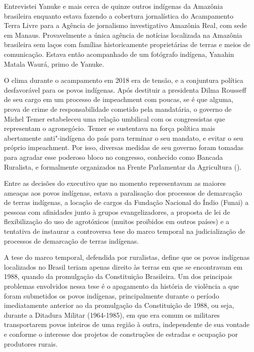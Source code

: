 \asterisc

Entrevistei Yanuke e mais cerca de quinze outros indígenas da Amazônia
brasileira enquanto estava fazendo a cobertura jornalística do
Acampamento Terra Livre para a Agência de jornalismo investigativo
Amazônia Real, com sede em Manaus. Provavelmente a única agência de
notícias localizada na Amazônia brasileira sem laços com famílias
historicamente proprietárias de terras e meios de comunicação. Estava
então acompanhado de um fotógrafo indígena, Yanahin Matala Waurá, primo
de Yanuke.

O clima durante o acampamento em 2018 era de tensão, e a conjuntura
política desfavorável para os povos indígenas. Após destituir a
presidenta Dilma Rousseff de seu cargo em um processo de impeachment com
poucas, se é que alguma, prova de crime de responsabilidade cometido
pela mandatária, o governo de Michel Temer estabeleceu uma relação
umbilical com os congressistas que representam o agronegócio. Temer se
sustentava na força política mais abertamente anti"-indígena do país para
terminar o seu mandato, e evitar o seu próprio impeachment. Por isso,
diversas medidas de seu governo foram tomadas para agradar esse poderoso
bloco no congresso, conhecido como Bancada Ruralista, e formalmente
organizados na Frente Parlamentar da Agricultura ().

Entre as decisões do executivo que no momento representavam as maiores
ameaças aos povos indígenas, estava a paralisação dos processos de
demarcação de terras indígenas, a locação de cargos da Fundação Nacional
do Índio (Funai) a pessoas com afinidades junto à grupos
evangelizadores, a proposta de lei de flexibilização do uso de
agrotóxicos (muitos proibidos em outros países) e a tentativa de
instaurar a controversa tese do marco temporal na judicialização de
processos de demarcação de terras indígenas.

A tese do marco temporal, defendida por ruralistas, define que os povos
indígenas localizados no Brasil teriam apenas direito às terras em que
se encontravam em 1988, quando da promulgação da Constituição
Brasileira. Um dos principais problemas envolvidos nessa tese é o
apagamento da história de violência a que foram submetidos os povos
indígenas, principalmente durante o período imediatamente anterior ao da
promulgação da Constituição de 1988, ou seja, durante a Ditadura Militar
(1964-1985), em que era comum os militares transportarem povos inteiros
de uma região à outra, independente de sua vontade e conforme o
interesse dos projetos de construções de estradas e ocupação por
produtores rurais.

